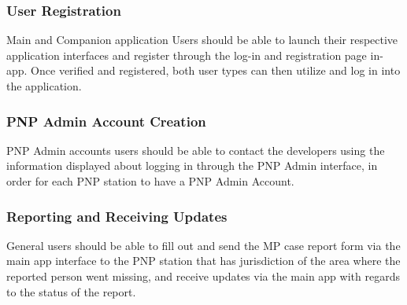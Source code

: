 \subsubsection{User Registration}
Main and Companion application Users should be able to launch their respective application interfaces and register through the log-in and registration page in-app. Once verified and registered, both user types can then utilize and log in into the application. 

\subsubsection{PNP Admin Account Creation}
PNP Admin accounts users should be able to contact the developers using the information displayed about logging in through the PNP Admin interface, in order for each PNP station to have a PNP Admin Account. 

\subsubsection{Reporting and Receiving Updates}
General users should be able to fill out and send the MP case report form via the main app interface to the PNP station that has jurisdiction of the area where the reported person went missing, and receive updates via the main app with regards to the status of the report.

